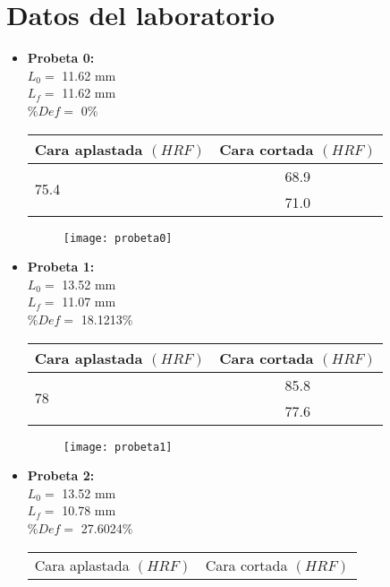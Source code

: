 \documentclass[a4paper,12pt]{report}
\begin{document}
\chapter{Datos del laboratorio}
\begin{itemize} 
\item \textbf{Probeta 0:}\\
$L_{0}=$ 11.62 mm\\
$L_{f}=$ 11.62 mm\\
$\%Def=$ 0\%\\
\begin{table}[htb]
\centering
\begin{tabular}{|l|c|}
\hline
Cara aplastada $(HRF)$ & Cara cortada $(HRF)$ \\
\hline \hline
\multirow{2}{1cm}{75.4} & 68.9 \\ \cline{2-2}
& 71.0 \\ \hline
\end{tabular}
\end{table}
\begin{figure}[H]
\centering
\texttt{[image: probeta0]}
\end{figure}
\item \textbf{Probeta 1:}\\
$L_{0}=$ 13.52 mm\\
$L_{f}=$ 11.07 mm\\
$\%Def=$ 18.1213\%\\
\begin{table}[htb]
\centering
\begin{tabular}{|l|c|}
\hline
Cara aplastada $(HRF)$ & Cara cortada $(HRF)$ \\
\hline \hline
\multirow{2}{1cm}{78} & 85.8 \\ \cline{2-2}
& 77.6 \\ \hline
\end{tabular}
\end{table}
\begin{figure}[H]
\centering
\texttt{[image: probeta1]}
\end{figure}
\newpage
\item \textbf{Probeta 2:}\\
$L_{0}=$ 13.52 mm\\
$L_{f}=$ 10.78 mm\\
$\%Def=$ 27.6024\%\\
\begin{table}[htb]
\centering
\begin{tabular}{|l|c|}
\hline
Cara aplastada $(HRF)$ & Cara cortada $(HRF)$ \\

\end{tabular}
\end{table}
\end{itemize}
\end{document}
